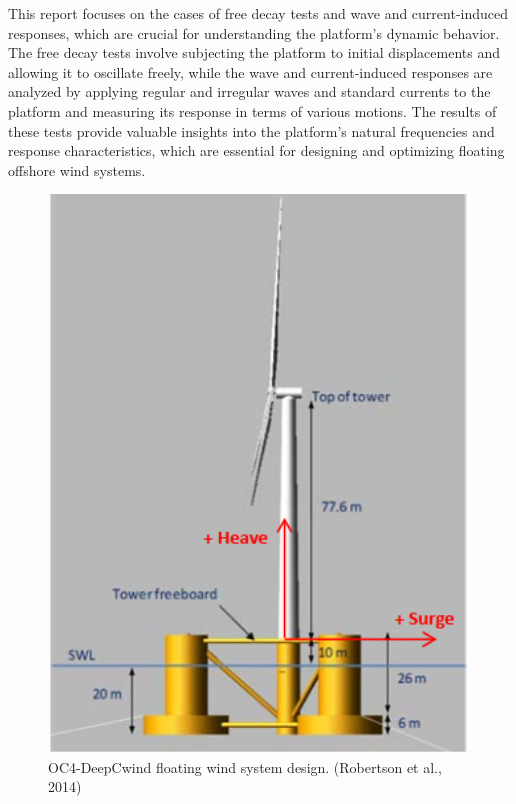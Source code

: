 \documentclass[a4paper, 11pt]{article}
\begin{document}
This report focuses on the cases of free decay tests and wave and current-induced responses, which are crucial for understanding the platform's dynamic behavior. The free decay tests involve subjecting the platform to initial displacements and allowing it to oscillate freely, while the wave and current-induced responses are analyzed by applying regular and irregular waves and standard currents to the platform and measuring its response in terms of various motions.
The results of these tests provide valuable insights into the platform's natural frequencies and response characteristics, which are essential for designing and optimizing floating offshore wind systems.
\vspace{0.5cm}

\begin{figure}[htbp]
    \begin{minipage}{0.47\textwidth}
        \centering
        \includegraphics[width=0.99\textwidth]{OC4.png}
        \caption{\small OC4-DeepCwind floating wind system design. (Robertson et al., 2014)}

\end{minipage}
\end{figure}
\end{document}
